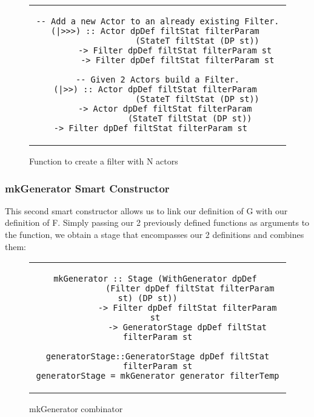 \begin{figure}[H]
    \begin{tabular}{c}
        \begin{lstlisting}
-- Add a new Actor to an already existing Filter.
(|>>>) :: Actor dpDef filtStat filterParam 
                (StateT filtStat (DP st))
        -> Filter dpDef filtStat filterParam st	
        -> Filter dpDef filtStat filterParam st

-- Given 2 Actors build a Filter.
(|>>) :: Actor dpDef filtStat filterParam 
                (StateT filtStat (DP st))
    -> Actor dpDef filtStat filterParam 
                (StateT filtStat (DP st))	
    -> Filter dpDef filtStat filterParam st       
        \end{lstlisting}
    \end{tabular}
    \caption[{[Code]} Building filters]{Function to create a filter with N actors}
    \label{fig:HC11}
\end{figure}

\subsubsection*{mkGenerator Smart Constructor}
This second smart constructor allows us to link our definition of G with our definition of F.
Simply passing our 2 previously defined functions as arguments to the function, we obtain a stage that encompasses our 2 definitions and combines them:
\begin{figure}[H]
    \begin{tabular}{c}
        \begin{lstlisting}
mkGenerator :: Stage (WithGenerator dpDef 
             (Filter dpDef filtStat filterParam st) (DP st))	
            -> Filter dpDef filtStat filterParam st	
            -> GeneratorStage dpDef filtStat filterParam st
            
generatorStage::GeneratorStage dpDef filtStat filterParam st
generatorStage = mkGenerator generator filterTemp
        \end{lstlisting}
    \end{tabular}
    \caption[{[Code]}mkGenerator ]{mkGenerator combinator}
    \label{fig:HC12}
\end{figure}

